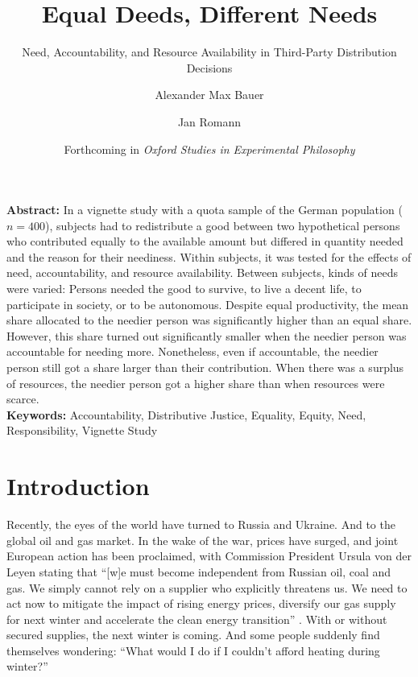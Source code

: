 \documentclass[egregdoesnotlikesansseriftitles]{scrartcl}
\title{Equal Deeds, Different Needs}
\subtitle{Need, Accountability, and Resource Availability in Third-Party Distribution Decisions}
\author[1]{Alexander Max Bauer}
\author[2]{Jan Romann}
\affil[1]{ Department of Philosophy, University of Oldenburg,

Corresponding Author, E-Mail: \href{mailto:alexander.max.bauer@uni-oldenburg.de}{alexander.max.bauer@uni-oldenburg.de}}
\affil[2]{ SOCIUM Research Center on Inequality and Social Policy, University of Bremen}
\date{\small Forthcoming in \textit{Oxford Studies in Experimental Philosophy}}
\begin{document}
\maketitle

\vspace{\fill}
\noindent\textbf{Abstract:} In a vignette study with a quota sample of the German population ($n=400$), subjects had to redistribute a good between two hypothetical persons who contributed equally to the available amount but differed in quantity needed and the reason for their neediness.
Within subjects, it was tested for the effects of need, accountability, and resource availability.
Between subjects, kinds of needs were varied: Persons needed the good to survive, to live a decent life, to participate in society, or to be autonomous.
Despite equal productivity, the mean share allocated to the needier person was significantly higher than an equal share.
However, this share turned out significantly smaller when the needier person was accountable for needing more.
Nonetheless, even if accountable, the needier person still got a share larger than their contribution.
When there was a surplus of resources, the needier person got a higher share than when resources were scarce.\\[2ex]

\noindent\textbf{Keywords:} Accountability, Distributive Justice, Equality, Equity, Need, Responsibility, Vignette Study\\[0.5ex]


\newpage
\section{Introduction}\label{sec:introduction}
Recently, the eyes of the world have turned to Russia and Ukraine.
And to the global oil and gas market.
In the wake of the war, prices have surged, and joint European action has been proclaimed, with Commission President Ursula von der Leyen stating that ``[w]e must become independent from Russian oil, coal and gas.
We simply cannot rely on a supplier who explicitly threatens us. 
We need to act now to mitigate the impact of rising energy prices, diversify our gas supply for next winter and accelerate the clean energy transition'' \citep[par. 3]{european_repowereu_2022}.
With or without secured supplies, the next winter is coming.
And some people suddenly find themselves wondering: ``What would I do if I couldn't afford heating during winter?''
\end{document}
